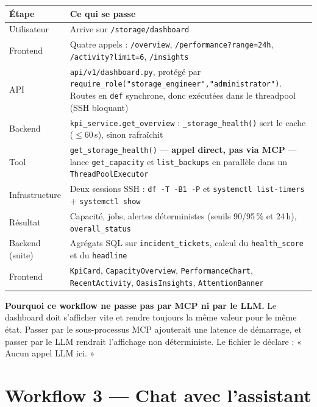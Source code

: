 \documentclass[11pt,a4paper]{report}
\newcommand{\file}[1]{\texttt{\small #1}}
\newcommand{\fn}[1]{\texttt{\small\textcolor{oasisviolet}{#1}}}
\newcommand{\cls}[1]{\texttt{\small\textcolor{oasisblue}{#1}}}
\newcommand{\tbl}[1]{\texttt{\small\textcolor{oasisamber}{#1}}}
\newcommand{\route}[1]{\texttt{\small\textcolor{oasisgreen}{#1}}}
\begin{document}
\begin{longtable}{@{}p{2.9cm}p{11.9cm}@{}}
\toprule
\textbf{Étape} & \textbf{Ce qui se passe}\\
\midrule
\endhead
Utilisateur & Arrive sur \route{/storage/dashboard}\\
Frontend & Quatre appels : \route{/overview}, \route{/performance?range=24h}, \route{/activity?limit=6}, \route{/insights}\\
API & \file{api/v1/dashboard.py}, protégé par \fn{require\_role("storage\_engineer","administrator")}. Routes en \texttt{def} synchrone, donc exécutées dans le threadpool (SSH bloquant)\\
Backend & \fn{kpi\_service.get\_overview} : \fn{\_storage\_health()} sert le cache (\(\le 60\)\,s), sinon rafraîchit\\
Tool & \fn{get\_storage\_health()} --- \textbf{appel direct, pas via MCP} --- lance \fn{get\_capacity} et \fn{list\_backups} en parallèle dans un \cls{ThreadPoolExecutor}\\
Infrastructure & Deux sessions SSH : \texttt{df -T -B1 -P} et \texttt{systemctl list-timers} + \texttt{systemctl show}\\
Résultat & Capacité, jobs, alertes déterministes (seuils 90/95\,\% et 24\,h), \texttt{overall\_status}\\
Backend (suite) & Agrégats SQL sur \tbl{incident\_tickets}, calcul du \texttt{health\_score} et du \texttt{headline}\\
Frontend & \cls{KpiCard}, \cls{CapacityOverview}, \cls{PerformanceChart}, \cls{RecentActivity}, \cls{OasisInsights}, \cls{AttentionBanner}\\
\bottomrule
\end{longtable}

\begin{keybox}
\textbf{Pourquoi ce workflow ne passe pas par MCP ni par le LLM.} Le dashboard
doit s'afficher vite et rendre toujours la même valeur pour le même état.
Passer par le sous-processus MCP ajouterait une latence de démarrage, et passer
par le LLM rendrait l'affichage non déterministe. Le fichier le déclare :
« Aucun appel LLM ici. »
\end{keybox}

\section{Workflow 3 --- Chat avec l'assistant}
\end{document}

